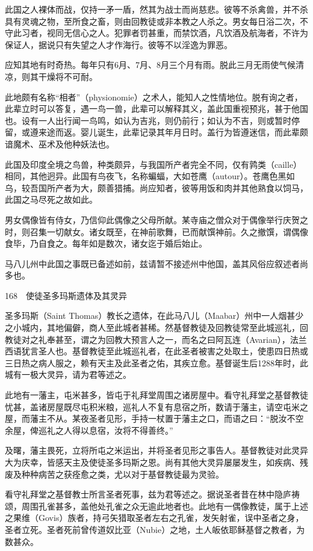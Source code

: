 \documentclass[12pt,UTF8]{ctexbook}
\begin{document}
此国之人裸体而战，仅持一矛一盾，然其为战士而尚慈悲。彼等不杀禽兽，并不杀具有灵魂之物，至所食之畜，则由回教徒或非本教之人杀之。男女每日浴二次，不守此习者，视同无信心之人。犯罪者罚甚重，而禁饮酒，凡饮酒及航海者，不许为保证人，据说只有失望之人才作海行。彼等不以淫逸为罪恶。

应知其地有时奇热。每年只有6月、7月、8月三个月有雨。脱此三月无雨使气候清凉，则其干燥将不可耐。

此地颇有名称“相者”（physionomie）之术人，能知人之性情地位。脱有询之者，此辈立时可以答复，遇一鸟一兽，此辈可以解释其义，盖此国重视预兆，甚于他国也。设有一人出行闻一鸟鸣，如认为吉兆，则仍前行；如认为不吉，则或暂时停留，或遵来途而返。婴儿诞生，此辈记录其年月日时。盖行为皆遵迷信，而此辈颇谙魔术、巫术及他种妖法也。

此国及印度全境之鸟兽，种类颇异，与我国所产者完全不同，仅有鹑类（caille）相同，其他迥异。此国有鸟夜飞，名称蝙蝠，大如苍鹰（autour）。苍鹰色黑如乌，较吾国所产者为大，颇善猎捕。尚应知者，彼等用饭和肉并其他熟食以饲马，此国之马尽死之故如此。

男女偶像皆有侍女，乃信仰此偶像之父母所献。某寺庙之僧众对于偶像举行庆贺之时，则召集一切献女。诸女既至，在神前歌舞，已而献馔神前。久之撤馔，谓偶像食毕，乃自食之。每年如是数次，诸女迄于婚后始止。

马八儿州中此国之事既已备述如前，兹请暂不接述州中他国，盖其风俗应叙述者尚多也。





168　使徒圣多玛斯遗体及其灵异

圣多玛斯（Saint Thomas）教长之遗体，在此马八儿（Maabar）州中一人烟甚少之小城内，其地偏僻，商人至此城者甚稀。然基督教徒及回教徒常至此城巡礼，回教徒对之礼奉甚至，谓之为回教大预言人之一，而名之曰阿瓦连（Avarian），法兰西语犹言圣人也。基督教徒至此城巡礼者，在此圣者被害之处取土，使患四日热或三日热之病人服之，赖有天主及此圣者之佑，其疾立愈。基督诞生后1288年时，此城有一极大灵异，请为君等述之。

此地有一藩主，屯米甚多，皆屯于礼拜堂周围之诸房屋中。看守礼拜堂之基督教徒忧甚，盖诸房屋既尽屯积米粮，巡礼人不复有息宿之所，数请于藩主，请空屯米之屋，而藩主不从。某夜圣者见形，手持一杖置于藩主之口，而语之曰：“脱汝不空余屋，俾巡礼之人得以息宿，汝将不得善终。”

及曙，藩主畏死，立将所屯之米运出，并将圣者见形之事告人。基督教徒对此灵异大为庆幸，皆感天主及使徒圣多玛斯之恩。尚有其他大灵异屡屡发生，如疾病、残废及种种病苦之获痊愈之类，尤以对于基督教徒最为灵验。

看守礼拜堂之基督教士所言圣者死事，兹为君等述之。据说圣者昔在林中隐庐祷颂，周围孔雀甚多，盖他处孔雀之众无逾此地者也。此地有一偶像教徒，属于上述之果维（Govis）族者，持弓矢猎取圣者左右之孔雀，发矢射雀，误中圣者之身，圣者立死。圣者死前曾传道奴比亚（Nubie）之地，土人皈依耶稣基督之教者，为数甚众。
\end{document}
